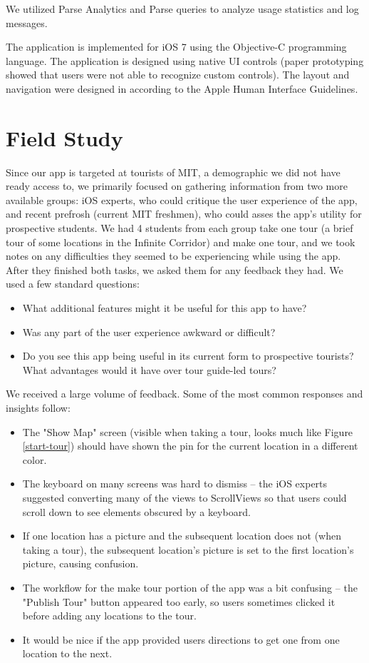 \documentclass{sigchi}
\begin{document}
We utilized Parse Analytics and Parse queries to analyze usage statistics and log messages. 

The application is implemented for iOS 7 using the Objective-C programming language. The application is designed using native UI controls (paper prototyping showed that users were not able to recognize custom controls). The layout and navigation were designed in according to the Apple Human Interface Guidelines.
    
\section{Field Study}
Since our app is targeted at tourists of MIT, a demographic we did not have ready access to, we primarily focused on gathering information from two more available groups: iOS experts, who could critique the user experience of the app, and recent prefrosh (current MIT freshmen), who could asses the app's utility for prospective students. We had 4 students from each group take one tour (a brief tour of some locations in the Infinite Corridor) and make one tour, and we took notes on any difficulties they seemed to be experiencing while using the app. After they finished both tasks, we asked them for any feedback they had. We used a few standard questions:
\begin{itemize}
\item What additional features might it be useful for this app to have?
\item Was any part of the user experience awkward or difficult?
\item Do you see this app being useful in its current form to prospective tourists? What advantages would it have over tour guide-led tours?
\end{itemize}
We received a large volume of feedback. Some of the most common responses and insights follow:
\begin{itemize}
\item The "Show Map" screen (visible when taking a tour, looks much like Figure \ref{start-tour}) should have shown the pin for the current location in a different color.
\item The keyboard on many screens was hard to dismiss -- the iOS experts suggested converting many of the views to ScrollViews so that users could scroll down to see elements obscured by a keyboard.
\item If one location has a picture and the subsequent location does not (when taking a tour), the subsequent location's picture is set to the first location's picture, causing confusion.
\item The workflow for the make tour portion of the app was a bit confusing -- the "Publish Tour" button appeared too early, so users sometimes clicked it before adding any locations to the tour.
\item It would be nice if the app provided users directions to get one from one location to the next.
\end{itemize}
\end{document}
